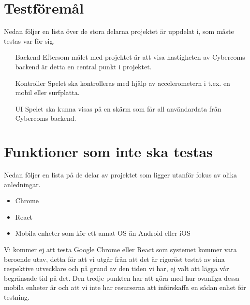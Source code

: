 \documentclass[10pt]{article}
\begin{document}
	
\section{Testföremål}
	Nedan följer en lista över de stora delarna projektet är uppdelat i, som måste testas var för sig.
	\begin{itemize}
	\item [Backend] Eftersom målet med projektet är att visa hastigheten av Cybercoms backend är detta en central punkt i projektet.
	\item [Kontroller] Spelet ska kontrolleras med hjälp av accelerometern i t.ex. en mobil eller surfplatta.
	\item [UI] Spelet ska kunna visas på en skärm som får all användardata från Cybercoms backend.
	\end{itemize}
	
	
\section{Funktioner som inte ska testas}
	Nedan följer en lista på de delar av projektet som ligger utanför fokus av olika anledningar.
	\begin{itemize}
	\item Chrome
	\item React
	\item Mobila enheter som kör ett annat OS än Android eller iOS
	\end{itemize}
	Vi kommer ej att testa Google Chrome eller React som systemet kommer vara beroende utav, detta för att vi utgår från att det är rigoröst testat av sina respektive utvecklare och på grund av den tiden vi har, ej valt att lägga vår begränsade tid på det. Den tredje punkten har att göra med hur ovanliga dessa mobila enheter är och att vi inte har resurserna att införskaffa en sådan enhet för testning. 
\end{document}
